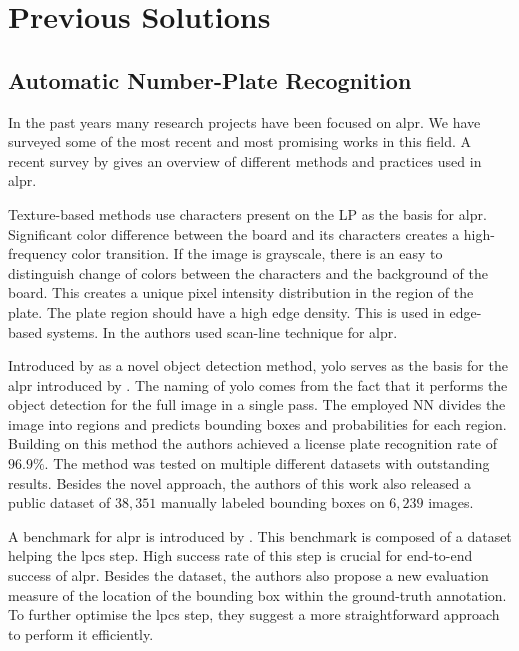 \section{Previous Solutions}
\label{previous-solutions}

\subsection{Automatic Number-Plate Recognition}
\label{previous-solutions-anpr}
In the past years many research projects have been focused on \ac{alpr}.
We have surveyed some of the most recent and most promising works in this field.
A recent survey by \cite{survOnMet} gives an overview of different methods and
practices used in \ac{alpr}.

Texture-based methods use characters present on the \ac{LP} as the basis for
\ac{alpr}. Significant color difference between the board and its characters
creates a high-frequency color transition. If the image is grayscale,
there is an easy to distinguish change of colors between the characters and the
background of the board. This creates a unique pixel intensity distribution in
the region of the plate. The plate region should have a high edge density. This
is used in edge-based systems. In \cite{HongFuJiaHuan} the authors used
scan-line technique for \ac{alpr}.

Introduced by \cite{redmon2016look} as a novel object detection method,
\ac{yolo} serves as the basis for the \ac{alpr} introduced by
\cite{DBLP:journals/corr/abs-1909-01754}.
The naming of \ac{yolo} comes from the fact that it performs the object detection
for the full image in a single pass. The employed \ac{NN} divides the image
into regions and predicts bounding boxes and probabilities for each region.
Building on this method the authors achieved a license plate recognition rate of
$96.9\%$.  The method was tested on multiple different datasets with outstanding
results.  Besides the novel approach, the authors of this work also released
a public dataset of $38,351$ manually labeled bounding boxes on $6,239$ images.

A benchmark for \ac{alpr} is introduced by
\cite{DBLP:journals/corr/GoncalvesSMS16}. This benchmark is
composed of a dataset helping the \ac{lpcs} step. High success rate of this step
is crucial for end-to-end success of \ac{alpr}. Besides the dataset, the authors
also propose a new evaluation measure of the location of the bounding
box within the ground-truth annotation. To further optimise the \ac{lpcs} step,
they suggest a more straightforward approach to perform it efficiently.

